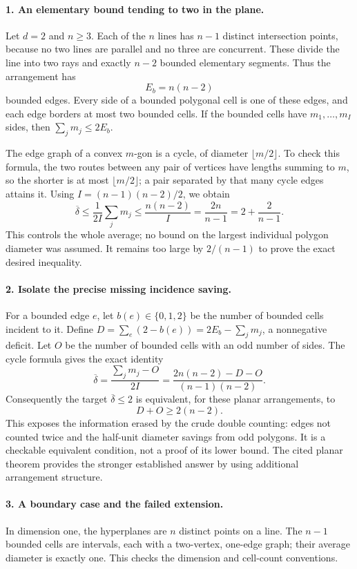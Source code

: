\documentclass[11pt,a4paper]{article}
\begin{document}
\paragraph{1. An elementary bound tending to two in the plane.}
Let $d=2$ and $n\ge3$. Each of the $n$ lines has $n-1$ distinct
intersection points, because no two lines are parallel and no three
are concurrent. These divide the line into two rays and exactly
$n-2$ bounded elementary segments. Thus the arrangement has
\[
 E_b=n(n-2)
\]
bounded edges. Every side of a bounded polygonal cell is one of these
edges, and each edge borders at most two bounded cells. If the
bounded cells have $m_1,\ldots,m_I$ sides, then
$\sum_jm_j\le2E_b$.

The edge graph of a convex $m$-gon is a cycle, of diameter
$\lfloor m/2\rfloor$. To check this formula, the two routes between
any pair of vertices have lengths summing to $m$, so the shorter is
at most $\lfloor m/2\rfloor$; a pair separated by that many cycle
edges attains it. Using $I=(n-1)(n-2)/2$, we obtain
\[
 \overline\delta\le\frac1{2I}\sum_jm_j
 \le\frac{n(n-2)}I=\frac{2n}{n-1}
 =2+\frac2{n-1}.
\]
This controls the whole average; no bound on the largest individual
polygon diameter was assumed. It remains too large by $2/(n-1)$
to prove the exact desired inequality.

\paragraph{2. Isolate the precise missing incidence saving.}
For a bounded edge $e$, let $b(e)\in\{0,1,2\}$ be the number of
bounded cells incident to it. Define
$D=\sum_e(2-b(e))=2E_b-\sum_jm_j$, a nonnegative deficit.
Let $O$ be the number of bounded cells with an odd number of sides.
The cycle formula gives the exact identity
\[
 \overline\delta
 =\frac{\sum_jm_j-O}{2I}
 =\frac{2n(n-2)-D-O}{(n-1)(n-2)}.
\]
Consequently the target $\overline\delta\le2$ is equivalent, for
these planar arrangements, to
\[
 D+O\ge2(n-2).
\]
This exposes the information erased by the crude double counting:
edges not counted twice and the half-unit diameter savings from odd
polygons. It is a checkable equivalent condition, not a proof of its
lower bound. The cited planar theorem provides the stronger established
answer by using additional arrangement structure.

\paragraph{3. A boundary case and the failed extension.}
In dimension one, the hyperplanes are $n$ distinct points on a line.
The $n-1$ bounded cells are intervals, each with a two-vertex,
one-edge graph; their average diameter is exactly one. This checks
the dimension and cell-count conventions.
\end{document}
